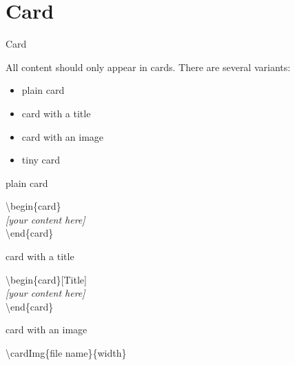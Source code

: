 \documentclass[aspectratio=43]{beamer}
\begin{document}
\section{Card}
\begin{frame}{Card}
\begin{card}
All content should only appear in cards. There are several variants:
\begin{itemize}
\item plain card
\item card with a title
\item card with an image
\item tiny card
\end{itemize}
\end{card}
\end{frame}

\begin{frame}{plain card}
\begin{card}
\end{card}

\begin{card}
{\color{primary} \textbackslash begin\{card\}\\[2mm]}
\null\qquad \textit{[your content here]}\\[2mm]
{\color{primary} \textbackslash end\{card\}}
\end{card}
\end{frame}

\begin{frame}{card with a title}
\begin{card}[Title]
\end{card}

\begin{card}
{\color{primary} \textbackslash begin\{card\}[Title]\\[2mm]}
\null\qquad \textit{[your content here]}\\[2mm]
{\color{primary} \textbackslash end\{card\}}
\end{card}
\end{frame}

\begin{frame}{card with an image}
\centering
{}

\begin{card}
{\color{primary} \textbackslash cardImg\{file name\}\{width\}}
\end{card}
\end{frame}
\end{document}
